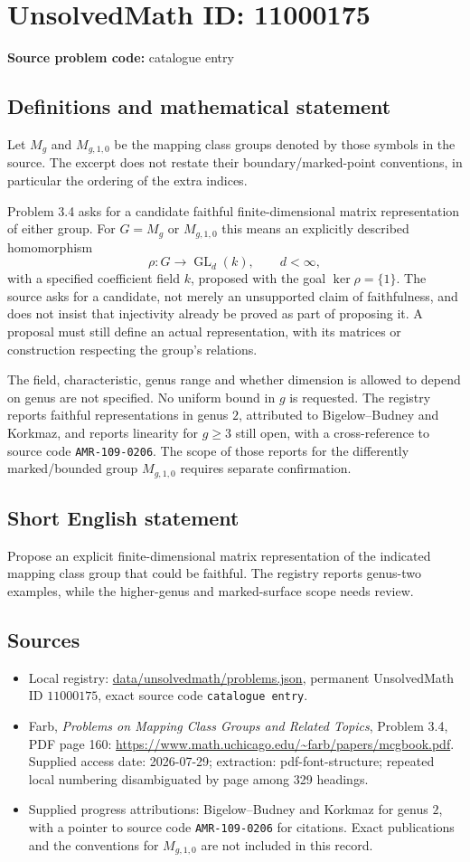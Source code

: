 \documentclass[11pt]{article}
\begin{document}
\section*{UnsolvedMath ID: 11000175}
\textbf{Source problem code:} catalogue entry
\subsection{Definitions and mathematical statement}
Let $M_g$ and $M_{g,1,0}$ be the mapping class groups denoted by those symbols in the source. The excerpt does not restate their boundary/marked-point conventions, in particular the ordering of the extra indices.

Problem 3.4 asks for a candidate faithful finite-dimensional matrix representation of either group. For $G=M_g$ or $M_{g,1,0}$ this means an explicitly described homomorphism
\[
 \rho:G\longrightarrow\operatorname{GL}_d(k),\qquad d<\infty,
\]
with a specified coefficient field $k$, proposed with the goal $\ker\rho=\{1\}$. The source asks for a candidate, not merely an unsupported claim of faithfulness, and does not insist that injectivity already be proved as part of proposing it. A proposal must still define an actual representation, with its matrices or construction respecting the group's relations.

The field, characteristic, genus range and whether dimension is allowed to depend on genus are not specified. No uniform bound in $g$ is requested. The registry reports faithful representations in genus $2$, attributed to Bigelow--Budney and Korkmaz, and reports linearity for $g\geq3$ still open, with a cross-reference to source code \texttt{AMR-109-0206}. The scope of those reports for the differently marked/bounded group $M_{g,1,0}$ requires separate confirmation.
\subsection{Short English statement}
Propose an explicit finite-dimensional matrix representation of the indicated mapping class group that could be faithful. The registry reports genus-two examples, while the higher-genus and marked-surface scope needs review.
\subsection{Sources}
\begin{itemize}
\item Local registry: \url{data/unsolvedmath/problems.json}, permanent UnsolvedMath ID $11000175$, exact source code \texttt{catalogue entry}.
\item Farb, \emph{Problems on Mapping Class Groups and Related Topics}, Problem 3.4, PDF page 160: \url{https://www.math.uchicago.edu/~farb/papers/mcgbook.pdf}. Supplied access date: 2026-07-29; extraction: pdf-font-structure; repeated local numbering disambiguated by page among 329 headings.
\item Supplied progress attributions: Bigelow--Budney and Korkmaz for genus $2$, with a pointer to source code \texttt{AMR-109-0206} for citations. Exact publications and the conventions for $M_{g,1,0}$ are not included in this record.
\end{itemize}
\end{document}
